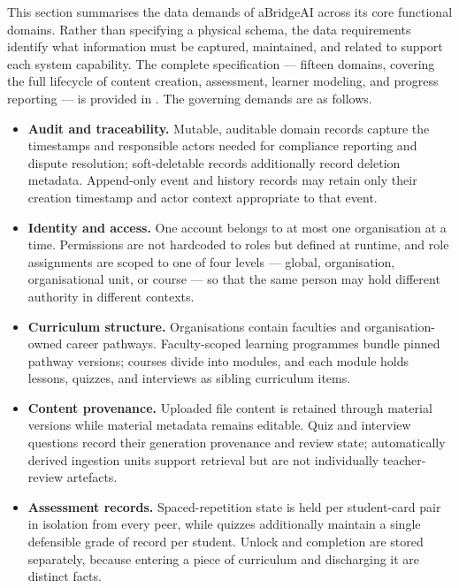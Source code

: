 This section summarises the data demands of aBridgeAI across its core
functional domains. Rather than specifying a physical schema, the data
requirements identify what information must be captured, maintained,
and related to support each system capability. The complete
specification --- fifteen domains, covering the full lifecycle of
content creation, assessment, learner modeling, and progress reporting
--- is provided in . The governing
demands are as follows.

\begin{itemize}
    \item \textbf{Audit and traceability.} Mutable, auditable domain
    records capture the timestamps and responsible actors needed for
    compliance reporting and dispute resolution; soft-deletable records
    additionally record deletion metadata. Append-only event and history
    records may retain only their creation timestamp and actor context
    appropriate to that event.

    \item \textbf{Identity and access.} One account belongs to at most
    one organisation at a time. Permissions are not hardcoded to roles
    but defined at runtime, and role assignments are scoped to one of
    four levels --- global, organisation, organisational unit, or
    course --- so that the same person may hold different authority in
    different contexts.

    \item \textbf{Curriculum structure.} Organisations contain
    faculties and organisation-owned career pathways. Faculty-scoped
    learning programmes bundle pinned pathway versions; courses divide
    into modules, and each module holds lessons, quizzes, and interviews
    as sibling curriculum items.

    \item \textbf{Content provenance.} Uploaded file content is retained
    through material versions while material metadata remains editable.
    Quiz and interview questions record their generation provenance and
    review state; automatically derived ingestion units support retrieval
    but are not individually teacher-review artefacts.

    \item \textbf{Assessment records.} Spaced-repetition state is held
    per student-card pair in isolation from every peer, while quizzes
    additionally maintain a single defensible grade of record per
    student. Unlock and completion are stored separately, because
    entering a piece of curriculum and discharging it are distinct
    facts.


\end{itemize}
